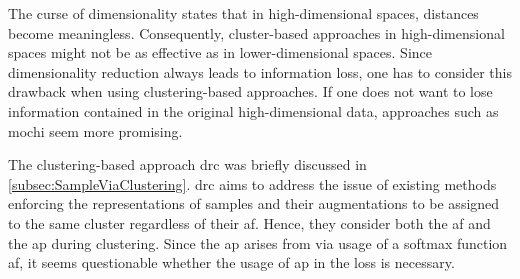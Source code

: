 The curse of dimensionality states that in high-dimensional spaces, distances become meaningless.
Consequently, cluster-based approaches in high-dimensional spaces might not be as effective as in lower-dimensional spaces.
Since dimensionality reduction always leads to information loss, one has to consider this drawback when using clustering-based approaches.
If one does not want to lose information contained in the original high-dimensional data, 
approaches such as \ac{mochi} seem more promising.

The clustering-based approach \ac{drc} \citet{DRC_2020} was briefly discussed in \autoref{subsec:SampleViaClustering}.
\ac{drc} aims to address the issue of existing methods enforcing the representations of samples 
and their augmentations to be assigned to the same cluster regardless of their \ac{af}.
Hence, they consider both the \ac{af} and the \ac{ap} during clustering.
Since the \ac{ap} arises from via usage of a softmax function \ac{af}, 
it seems questionable whether the usage of \ac{ap} in the loss is necessary.